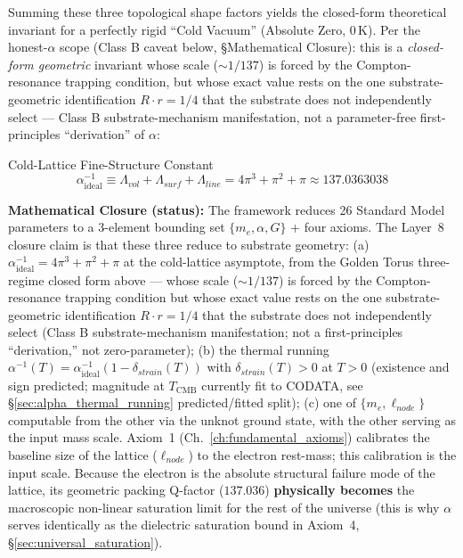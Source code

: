 Summing these three topological shape factors yields the closed-form theoretical invariant for a perfectly rigid ``Cold Vacuum'' (Absolute Zero, $0\,$K). Per the honest-$\alpha$ scope (Class B caveat below, \S Mathematical Closure): this is a \emph{closed-form geometric} invariant whose scale ($\sim 1/137$) is forced by the Compton-resonance trapping condition, but whose exact value rests on the one substrate-geometric identification $R \cdot r = 1/4$ that the substrate does not independently select --- Class B substrate-mechanism manifestation, not a parameter-free first-principles ``derivation'' of $\alpha$:

\begin{resultbox}{Cold-Lattice Fine-Structure Constant}
\begin{equation}
    \alpha^{-1}_{\text{ideal}} \equiv \Lambda_{vol} + \Lambda_{surf} + \Lambda_{line} = 4\pi^3 + \pi^2 + \pi \approx \mathbf{137.0363038}
    \label{eq:alpha_cold}
\end{equation}
\end{resultbox}

\textbf{Mathematical Closure (status):} The framework reduces 26 Standard Model parameters to a 3-element bounding set $\{m_e, \alpha, G\}$ + four axioms. The Layer~8 closure claim is that these three reduce to substrate geometry: (a) $\alpha^{-1}_{\text{ideal}} = 4\pi^3 + \pi^2 + \pi$ at the cold-lattice asymptote, from the Golden Torus three-regime closed form above --- whose scale ($\sim 1/137$) is forced by the Compton-resonance trapping condition but whose exact value rests on the one substrate-geometric identification $R \cdot r = 1/4$ that the substrate does not independently select (Class B substrate-mechanism manifestation; not a first-principles ``derivation,'' not zero-parameter); (b) the thermal running $\alpha^{-1}(T) = \alpha^{-1}_{\text{ideal}}(1 - \delta_{strain}(T))$ with $\delta_{strain}(T) > 0$ at $T > 0$ (existence and sign predicted; magnitude at $T_{\text{CMB}}$ currently fit to CODATA, see \S\ref{sec:alpha_thermal_running} predicted/fitted split); (c) one of $\{m_e, \ell_{node}\}$ computable from the other via the unknot ground state, with the other serving as the input mass scale. Axiom~1 (Ch.~\ref{ch:fundamental_axioms}) calibrates the baseline size of the lattice ($\ell_{node}$) to the electron rest-mass; this calibration is the input scale. Because the electron is the absolute structural failure mode of the lattice, its geometric packing Q-factor ($137.036$) \textbf{physically becomes} the macroscopic non-linear saturation limit for the rest of the universe (this is why $\alpha$ serves identically as the dielectric saturation bound in Axiom~4, \S\ref{sec:universal_saturation}).

